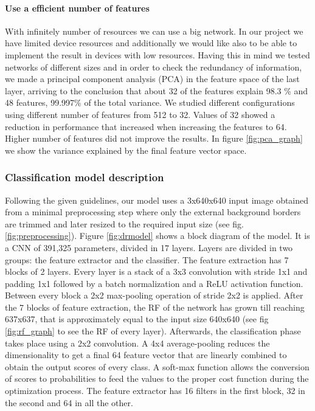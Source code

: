 \documentclass[preprint]{elsarticle}
\theoremstyle{definition} %
\theoremstyle{remark}
\begin{document}
\paragraph{Use a efficient number of features} With infinitely number of resources we can use a big network. In our project we have limited device resources and additionally we would like also to be able to implement the result in devices with low resources. Having this in mind we tested networks of different sizes and in order to check the redundancy of information, we made a principal component analysis (PCA) in the feature space of the last layer, arriving to the conclusion that about 32 of the features explain 98.3 \% and 48 features, 99.997\% of the total variance. We studied different configurations using different number of features from 512 to 32. Values of 32 showed a reduction in performance that increased when increasing the features to 64. Higher number of features did not improve the results. In figure \ref{fig:pca_graph} we show the variance explained by the final feature vector space.

\subsubsection{Classification model description}

Following the given guidelines, our model uses a 3x640x640 input image obtained from a minimal preprocessing step where only the external background borders are trimmed and later resized to the required input size (see fig. \ref{fig:preprocessing}). Figure \ref{fig:drmodel} shows a block diagram of the model. It is a CNN of 391,325 parameters, divided in 17 layers. Layers are divided in two groups: the feature extractor and the classifier. The feature extraction has 7 blocks of 2 layers. Every layer is a stack of a 3x3 convolution with stride 1x1 and padding 1x1 followed by a batch normalization and a ReLU activation function. Between every block a 2x2 max-pooling operation of stride 2x2 is applied. After the 7 blocks of feature extraction, the RF of the network has grown till reaching 637x637, that is approximately equal to the input size 640x640 (see fig \ref{fig:rf_graph} to see the RF of every layer). Afterwards, the classification phase takes place using a 2x2 convolution. A 4x4 average-pooling reduces the dimensionality to get a final 64 feature vector that are linearly combined to obtain the output scores of every class. A soft-max function allows the conversion of scores to probabilities to feed the values to the proper cost function during the optimization process. The feature extractor has 16 filters in the first block, 32 in the second and 64 in all the other.
\end{document}
